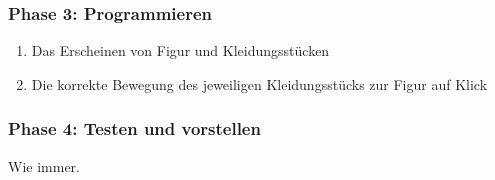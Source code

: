 \subsubsection{Phase 3: Programmieren}\label{phase-3-programmieren}

\begin{enumerate}
\item
  Das Erscheinen von Figur und Kleidungsstücken
\item
  Die korrekte Bewegung des jeweiligen Kleidungsstücks zur Figur auf
  Klick
\end{enumerate}

\subsubsection{Phase 4: Testen und
vorstellen}\label{phase-4-testen-und-vorstellen}

Wie immer.
